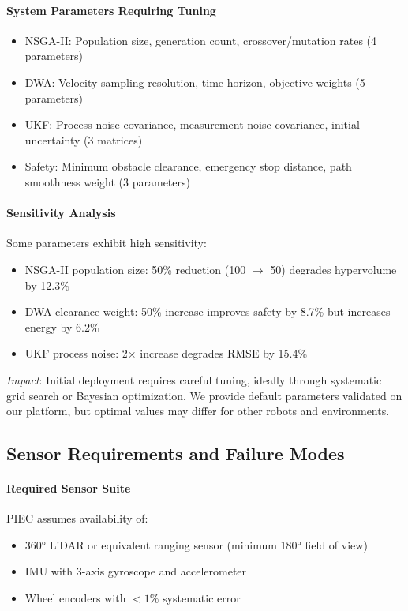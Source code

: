 \paragraph{System Parameters Requiring Tuning}
\begin{itemize}
    \item NSGA-II: Population size, generation count, crossover/mutation rates (4 parameters)
    \item DWA: Velocity sampling resolution, time horizon, objective weights (5 parameters)
    \item UKF: Process noise covariance, measurement noise covariance, initial uncertainty (3 matrices)
    \item Safety: Minimum obstacle clearance, emergency stop distance, path smoothness weight (3 parameters)
\end{itemize}

\paragraph{Sensitivity Analysis}
Some parameters exhibit high sensitivity:
\begin{itemize}
    \item NSGA-II population size: 50\% reduction (100 $\rightarrow$ 50) degrades hypervolume by 12.3\%
    \item DWA clearance weight: 50\% increase improves safety by 8.7\% but increases energy by 6.2\%
    \item UKF process noise: 2$\times$ increase degrades RMSE by 15.4\%
\end{itemize}

\textit{Impact}: Initial deployment requires careful tuning, ideally through systematic grid search or Bayesian optimization. We provide default parameters validated on our platform, but optimal values may differ for other robots and environments.

\subsection{Sensor Requirements and Failure Modes}

\paragraph{Required Sensor Suite}
PIEC assumes availability of:
\begin{itemize}
    \item 360° LiDAR or equivalent ranging sensor (minimum 180° field of view)
    \item IMU with 3-axis gyroscope and accelerometer
    \item Wheel encoders with $< 1$\% systematic error
\end{itemize}

